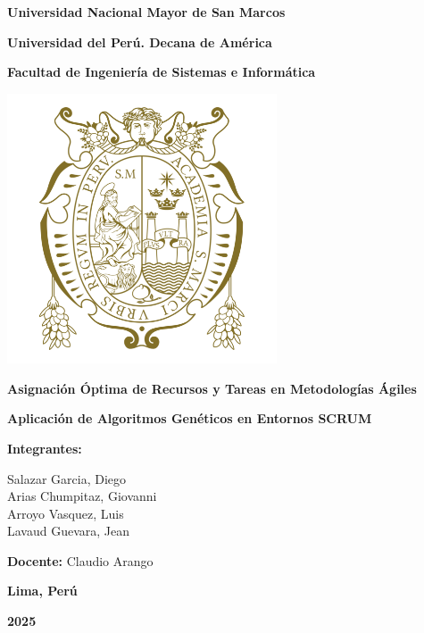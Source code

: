 \begin{titlepage}
    \centering
    {\LARGE\bfseries Universidad Nacional Mayor de San Marcos \par}
    {\large\bfseries Universidad del Perú. Decana de América\par}
    \vspace{0.5cm}
    {\Large\bfseries Facultad de Ingeniería de Sistemas e Informática\par}
    \vspace{0.5cm}

    \includegraphics[width=8cm]{imagenes/logo-unmsm.png}\par
    \vspace{0.5cm}

    {\LARGE\bfseries Asignación Óptima de Recursos y Tareas en Metodologías Ágiles\par}
    \vspace{0.5cm}
    {\large\bfseries Aplicación de Algoritmos Genéticos en Entornos SCRUM\par}
    \vspace{1cm}

    {\Large\bfseries Integrantes:\par}
    \vspace{0.5cm}
    Salazar Garcia, Diego\\[4pt]
    Arias Chumpitaz, Giovanni\\[4pt]
    Arroyo Vasquez, Luis\\[4pt]
    Lavaud Guevara, Jean\\[4pt]
    \vspace{1cm}

    {\large \textbf{Docente:} Claudio Arango\par}
    \vfill

    {\large\bfseries Lima, Perú\par}
    {\large\bfseries 2025\par}
\end{titlepage}
